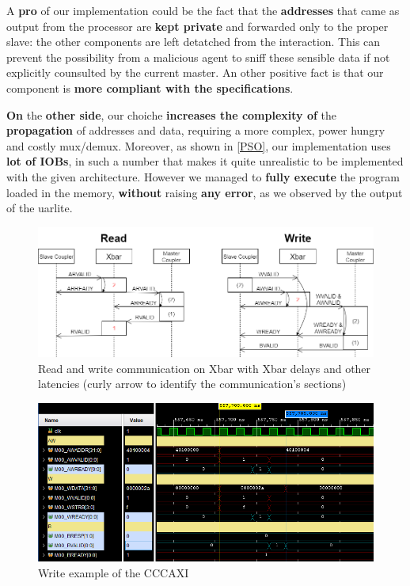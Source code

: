 A {\bf pro} of our implementation could be the fact that the {\bf addresses} that came as output from the processor are {\bf kept private} and forwarded only to the proper slave: the other components are left detatched from the interaction. This can prevent the possibility from a malicious agent to sniff these sensible data if not explicitly counsulted by the current master.
An other positive fact is that our component is {\bf more compliant with the specifications}.
\newline

{\bf On} the {\bf other side}, our choiche {\bf increases the complexity of} the {\bf propagation} of addresses and data, requiring a more complex, power hungry and costly mux/demux.
Moreover, as shown in \ref{PSO}, our implementation uses {\bf lot of IOBs}, in such a number that makes it quite unrealistic to be implemented with the given architecture. %
\newline
However we managed to {\bf fully execute} the program loaded in the memory, {\bf without} raising {\bf any error}, as we observed by the output of the uarlite. 

\begin{figure}[!hb]
  \includegraphics[width=\textwidth]{./../../img/Images/Read_Write_xbar}
  \caption{Read and write communication on Xbar with {\color{Red}Xbar delays} and other latencies (curly arrow to identify the communication's sections)}
  \label{RWXbar}
\end{figure}

\begin{figure}[!hb]
  \includegraphics[width=\textwidth]{./../../img/Images/CCCAXI_waform_write}
  \caption{Write example of the CCCAXI}
  \label{WriteCCC}
\end{figure}

